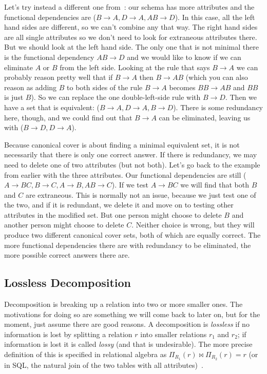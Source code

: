 Let's try instead a different one from~\cite{fds}: our schema has more attributes and the functional dependencies are ($B \rightarrow A, D \rightarrow A, AB \rightarrow D$). In this case, all the left hand sides are different, so we can't combine any that way. The right hand sides are all single attributes so we don't need to look for extraneous attributes there. But we should look at the left hand side. The only one that is not minimal there is the functional dependency $AB \rightarrow D$ and we would like to know if we can eliminate $A$ or $B$ from the left side. Looking at the rule that says $B \rightarrow A$ we can probably reason pretty well that if $B \rightarrow A$ then $B \rightarrow AB$  (which you can also reason as adding $B$ to both sides of the rule $B \rightarrow A$ becomes $BB \rightarrow AB$ and $BB$ is just $B$). So we can replace the one double-left-side rule with $B \rightarrow D$. Then we have a set that is equivalent: ($B \rightarrow A, D \rightarrow A, B \rightarrow D$). There is some redundancy here, though, and we could find out that $B \rightarrow A$ can be eliminated, leaving us with ($B \rightarrow D, D \rightarrow A$).

Because canonical cover is about finding a minimal equivalent set, it is not necessarily that there is only one correct answer. If there is redundancy, we may need to delete one of two attributes (but not both). Let's go back to the example from earlier with the three attributes. Our functional dependencies are still ($A \rightarrow BC, B \rightarrow C, A \rightarrow B, AB \rightarrow C$). If we test $A \rightarrow BC$ we will find that both $B$ and $C$ are extraneous. This is normally not an issue, because we just test one of the two, and if it is redundant, we delete it and move on to testing other attributes in the modified set. But one person might choose to delete $B$ and another person might choose to delete $C$. Neither choice is wrong, but they will produce two different canonical cover sets, both of which are equally correct. The more functional dependencies there are with redundancy to be eliminated, the more possible correct answers there are. 


\subsection*{Lossless Decomposition}

Decomposition is breaking up a relation into two or more smaller ones. The motivations for doing so are something we will come back to later on, but for the moment, just assume there are good reasons. A decomposition is \textit{lossless} if no information is lost by splitting a relation $r$ into smaller relations $r_{1}$ and $r_{2}$; if information is lost it is called \textit{lossy} (and that is undesirable). The more precise definition of this is specified in relational algebra as $\Pi_{R_{1}}(r) \bowtie \Pi_{R_{2}}(r) = r$ (or in SQL, the natural join of the two tables with all attributes)~\cite{dsc}. 

